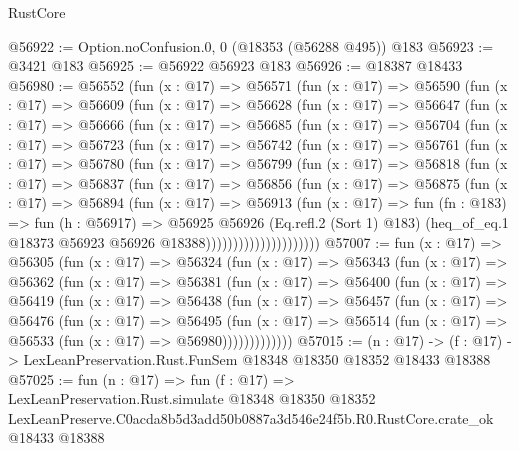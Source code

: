 \begin{lexlean}{RustCore}
\begin{coremodule}
@56922 := Option.noConfusion.{0, 0} (@18353 (@56288 @495)) @183
@56923 := @3421 @183
@56925 := @56922 @56923 @183
@56926 := @18387 @18433
@56980 := @56552
    (fun (x : @17) =>
    @56571
      (fun (x : @17) =>
      @56590
        (fun (x : @17) =>
        @56609
          (fun (x : @17) =>
          @56628
            (fun (x : @17) =>
            @56647
              (fun (x : @17) =>
              @56666
                (fun (x : @17) =>
                @56685
                  (fun (x : @17) =>
                  @56704
                    (fun (x : @17) =>
                    @56723
                      (fun (x : @17) =>
                      @56742
                        (fun (x : @17) =>
                        @56761
                          (fun (x : @17) =>
                          @56780
                            (fun (x : @17) =>
                            @56799
                              (fun (x : @17) =>
                              @56818
                                (fun (x : @17) =>
                                @56837
                                  (fun (x : @17) =>
                                  @56856
                                    (fun (x : @17) =>
                                    @56875
                                      (fun (x : @17) =>
                                      @56894
                                        (fun (x : @17) =>
                                        @56913
                                          (fun (x : @17) =>
                                          fun (fn : @183) =>
                                          fun (h : @56917) =>
                                          @56925
                                            @56926
                                            (Eq.refl.{2} (Sort 1) @183)
                                            (heq_of_eq.{1}
                                              @18373
                                              @56923
                                              @56926
                                              @18388)))))))))))))))))))))
@57007 := fun (x : @17) =>
  @56305
    (fun (x : @17) =>
    @56324
      (fun (x : @17) =>
      @56343
        (fun (x : @17) =>
        @56362
          (fun (x : @17) =>
          @56381
            (fun (x : @17) =>
            @56400
              (fun (x : @17) =>
              @56419
                (fun (x : @17) =>
                @56438
                  (fun (x : @17) =>
                  @56457
                    (fun (x : @17) =>
                    @56476
                      (fun (x : @17) =>
                      @56495
                        (fun (x : @17) =>
                        @56514 (fun (x : @17) => @56533 (fun (x : @17) => @56980)))))))))))))
@57015 := (n : @17) ->
  (f : @17) -> LexLeanPreservation.Rust.FunSem @18348 @18350 @18352 @18433 @18388
@57025 := fun (n : @17) =>
  fun (f : @17) =>
  LexLeanPreservation.Rust.simulate
    @18348
    @18350
    @18352
    LexLeanPreserve.C0acda8b5d3add50b0887a3d546e24f5b.R0.RustCore.crate_ok
    @18433
    @18388
\end{coremodule}
\end{lexlean}
